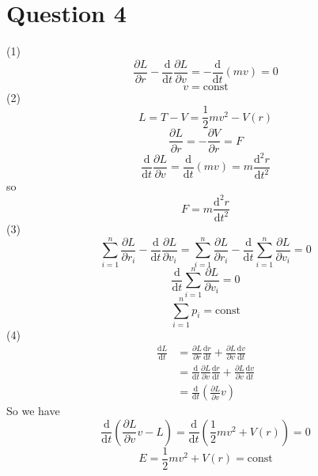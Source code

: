 \documentclass{article}
\begin{document}
\section{Question 4}
(1)
\begin{equation*}
    \frac{\partial L}{\partial r} - \frac{\mathrm{d}}{\mathrm{d}t} \frac{\partial L}{\partial v} = -\frac{\mathrm{d}}{\mathrm{d}t} (mv) = 0
\end{equation*}
\begin{equation*}
    v = \text{const}
\end{equation*}
(2)
\begin{equation*}
    L = T - V = \frac{1}{2}mv^2 - V(r)
\end{equation*}
\begin{equation*}
    \frac{\partial L}{\partial r} = -\frac{\partial V}{\partial r} = F
\end{equation*}
\begin{equation*}
    \frac{\mathrm{d}}{\mathrm{d}t} \frac{\partial L}{\partial v} = \frac{\mathrm{d}}{\mathrm{d}t} (mv) = m \frac{\mathrm{d}^2 r}{\mathrm{d} t^2}
\end{equation*}
so
\begin{equation*}
    F = m \frac{\mathrm{d}^2 r}{\mathrm{d} t^2}
\end{equation*}
(3)
\begin{equation*}
    \sum_{i = 1}^{n} \frac{\partial L}{\partial r_i} - \frac{\mathrm{d}}{\mathrm{d}t} \frac{\partial L}{\partial v_i} = \sum_{i = 1}^{n} \frac{\partial L}{\partial r_i} - \frac{\mathrm{d}}{\mathrm{d}t} \sum_{i = 1}^{n} \frac{\partial L}{\partial v_i} = 0
\end{equation*}
\begin{equation*}
    \frac{\mathrm{d}}{\mathrm{d}t} \sum_{i = 1}^{n} \frac{\partial L}{\partial v_i} = 0
\end{equation*}
\begin{equation*}
    \sum_{i = 1}^{n} p_i = \text{const}
\end{equation*}
(4)
\begin{align*}
    \frac{\mathrm{d}L}{\mathrm{d}t} 
    &= \frac{\partial L}{\partial r} \frac{\mathrm{d}r}{\mathrm{d}t} + \frac{\partial L}{\partial v} \frac{\mathrm{d}v}{\mathrm{d}t} \\
    &= \frac{\mathrm{d}}{\mathrm{d}t} \frac{\partial L}{\partial v} \frac{\mathrm{d}r}{\mathrm{d}t} + \frac{\partial L}{\partial v} \frac{\mathrm{d}v}{\mathrm{d}t} \\
    &= \frac{\mathrm{d}}{\mathrm{d}t} (\frac{\partial L}{\partial v} v)
\end{align*}
So we have
\begin{equation*}
    \frac{\mathrm{d}}{\mathrm{d}t} (\frac{\partial L}{\partial v} v - L) = \frac{\mathrm{d}}{\mathrm{d}t} (\frac{1}{2}mv^2 + V(r)) = 0
\end{equation*}
\begin{equation*}
    E = \frac{1}{2}mv^2 + V(r) = \text{const}
\end{equation*}
\end{document}
